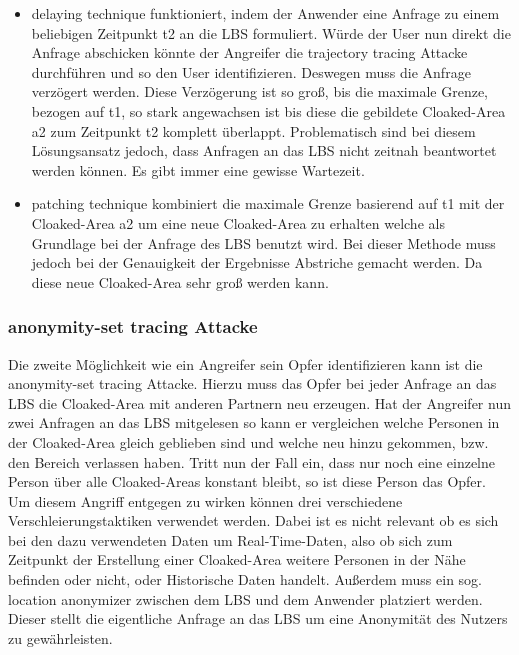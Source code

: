 \begin{itemize}

\item{delaying technique} funktioniert, indem der Anwender eine Anfrage zu einem beliebigen Zeitpunkt t2 an die LBS formuliert. Würde der User nun direkt die Anfrage abschicken könnte der Angreifer die trajectory tracing Attacke durchführen und so den User identifizieren. Deswegen muss die Anfrage verzögert werden. Diese Verzögerung ist so groß, bis die maximale Grenze, bezogen auf t1, so stark angewachsen ist bis diese die gebildete Cloaked-Area a2 zum Zeitpunkt t2 komplett überlappt. Problematisch sind bei diesem Lösungsansatz jedoch, dass Anfragen an das LBS nicht zeitnah beantwortet werden können. Es gibt immer eine gewisse Wartezeit.
\item{patching technique} kombiniert die maximale Grenze basierend auf t1 mit der Cloaked-Area a2 um eine neue Cloaked-Area zu erhalten welche als Grundlage bei der Anfrage des LBS benutzt wird. Bei dieser Methode muss jedoch bei der Genauigkeit der Ergebnisse Abstriche gemacht werden. Da diese neue Cloaked-Area sehr groß werden kann. 
\end{itemize}
\subsubsection{anonymity-set tracing Attacke}
Die zweite Möglichkeit wie ein Angreifer sein Opfer identifizieren kann ist die anonymity-set tracing Attacke. Hierzu muss das Opfer bei jeder Anfrage an das LBS die Cloaked-Area mit anderen Partnern neu erzeugen. Hat der Angreifer nun zwei Anfragen an das LBS mitgelesen so kann er vergleichen welche Personen in der Cloaked-Area gleich geblieben sind und welche neu hinzu gekommen, bzw. den Bereich verlassen haben. Tritt nun der Fall ein, dass nur noch eine einzelne Person über alle Cloaked-Areas konstant bleibt, so ist diese Person das Opfer.\\
Um diesem Angriff entgegen zu wirken können drei verschiedene Verschleierungstaktiken verwendet werden. Dabei ist es nicht relevant ob es sich bei den dazu verwendeten Daten um Real-Time-Daten, also ob sich zum Zeitpunkt der Erstellung einer Cloaked-Area weitere Personen in der Nähe befinden oder nicht,  oder Historische Daten handelt. Außerdem muss ein sog. location anonymizer zwischen dem LBS und dem Anwender platziert werden. Dieser stellt die eigentliche Anfrage an das LBS um eine Anonymität des Nutzers zu gewährleisten.
